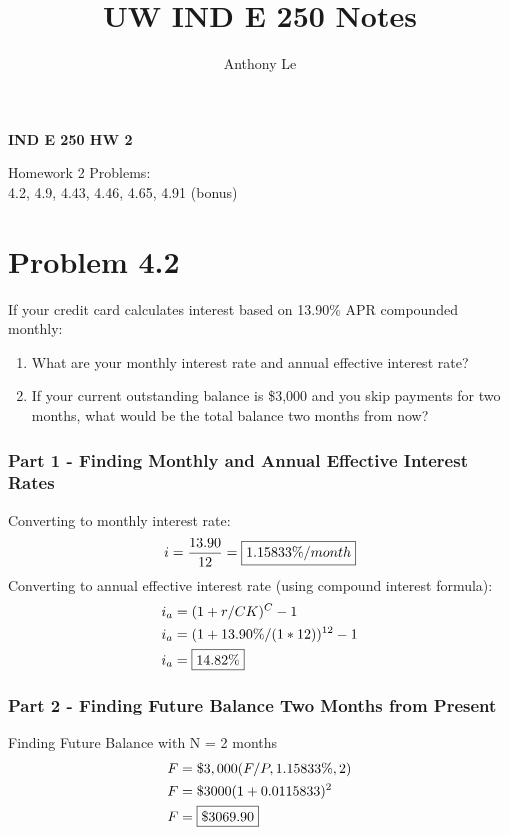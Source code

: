 \documentclass[../INDE250HW.tex]{subfiles}
\title{UW IND E 250 Notes}
\author{Anthony Le}
\begin{document}
\pagestyle{fancy}
\fancyhead{}

\begin{center}
    \LARGE{\textbf{IND E 250 HW 2}}
\end{center}
\begin{center}
    Homework 2 Problems: \\
    4.2, 4.9, 4.43, 4.46, 4.65, 4.91 (bonus)
\end{center}
\section*{Problem 4.2}
\begin{exrc}
    If your credit card calculates interest based on 13.90\% APR compounded monthly:
    \begin{enumerate}
        \item What are your monthly interest rate and annual effective interest rate?
        \item If your current outstanding balance is \$3,000 and you skip payments for two months, what would be the total balance two months from now?
    \end{enumerate}
\end{exrc}
\subsubsection*{Part 1 - Finding Monthly and Annual Effective Interest Rates}
Converting to monthly interest rate:
\begin{equation*}
    \begin{aligned}
        i = \frac{13.90}{12} = \framebox{$1.15833\%/month$}
    \end{aligned}
\end{equation*}
Converting to annual effective interest rate (using compound interest formula):
\begin{equation*}
    \begin{aligned}
        i_a &= (1 + r/CK)^C - 1 \\
        i_a &= (1 + 13.90\%/(1*12))^{12} - 1 \\
        i_a &= \framebox{$14.82\%$}
    \end{aligned}
\end{equation*}
\subsubsection*{Part 2 - Finding Future Balance Two Months from Present}
Finding Future Balance with N = 2 months
\begin{equation*}
    \begin{aligned}
        F &= \$3,000(F/P,1.15833\%,2) \\
        F &= \$3000(1 + 0.0115833)^2 \\
        F &= \framebox{$\$3069.90$} 
    \end{aligned}
\end{equation*}
\end{document}
